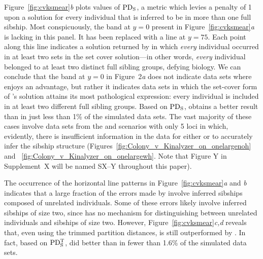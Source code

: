 Figure~\ref{fig:cvksmear}{\em b} plots values of $\mathrm{PD_S}$, a metric which levies a penalty of 1 upon a 
solution for every individual that is inferred to be in more than one full sibship.  Most 
conspicuously, the band at $y=0$ present in Figure~\ref{fig:cvksmear}{\em a} is lacking in this panel.  
It has been replaced with a line at $y=75$.  Each point along this line indicates a solution returned 
by \kinalyzer{} in which {\em every} individual occurred in at least two sets in the set cover 
solution---in other words, {\em every} individual belonged to at least two distinct full sibling 
groups, defying biology.  We can conclude that the band at $y=0$ in Figure~2{\em a} does not indicate 
data sets where \kinalyzer{} enjoys an advantage, but rather it indicates data sets in which the
set-cover form of \kinalyzer{}'s solution attains its most pathological expression: every individual is 
included in at least two different full sibling groups.  Based on $\mathrm{PD_S}$, \kinalyzer{} obtains a better 
result than \colony{} in just less than 1\% of the simulated data sets.  The vast majority of these 
cases involve data sets from the \onelargenoh{} and \onelargewh{} scenarios with only 5 loci in which, 
evidently, there is insufficient information in the data for either \colony{} or \kinalyzer{} to 
accurately infer the sibship structure (Figures~\ref{fig:Colony_v_Kinalyzer_on_onelargenoh} and~
\ref{fig:Colony_v_Kinalyzer_on_onelargewh}. Note that Figure Y in Supplement~X will be named SX--Y 
throughout this paper).  

The occurrence of the horizontal line patterns in Figure~\ref{fig:cvksmear}{\em a} and {\em b} 
indicates that a large fraction of the errors made by \kinalyzer{} involve inferred sibships composed 
of unrelated individuals.  Some of these errors likely involve inferred sibships of size two, since 
\kinalyzer{} has no mechanism for distinguishing between unrelated individuals and sibships of size 
two.   However, Figure~\ref{fig:cvksmear}{\em c,d} reveals that, even using the trimmed partition 
distances, \kinalyzer{} is still outperformed by \colony{}.   In fact, based on $\mathrm{PD_S^T}$, \kinalyzer{} 
did better than \colony{} in fewer than 1.6\% of the simulated data sets. 

